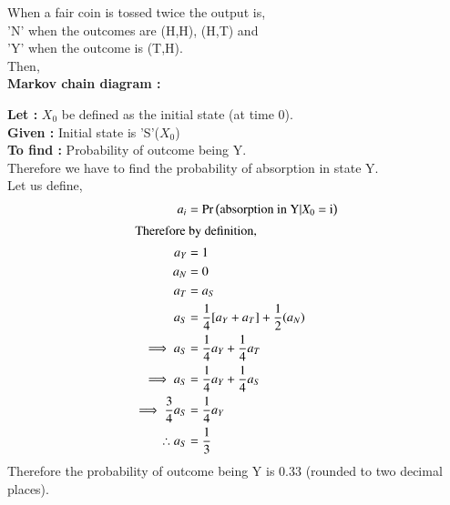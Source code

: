 \documentclass[journal,12pt,twocolumn]{IEEEtran}
\begin{document}
When a fair coin is tossed twice the output is, \\
'N' when the outcomes are (H,H), (H,T) and\\
'Y' when the outcome is (T,H).\\
Then, \\
\textbf{Markov chain diagram :}\\

\textbf{Let :} $X_0$ be defined as the initial state (at time 0). \\
\textbf{Given :} Initial state is 'S'($X_0$)\\
\textbf{To find :} Probability of outcome being Y.\\
Therefore we have to find the probability of absorption in state Y.\\
Let us define,
\begin{align}
    a_i &= \Pr\left(\text{absorption in Y$|X_0$ = i}\right)\\
\shortintertext{Therefore by definition,}
    a_Y &= 1\\
    a_N &= 0\\
    a_T &= a_S\\
    a_S &=  \frac{1}{4}[a_Y + a_T] + \frac{1}{2}(a_N)\\
    \implies a_S &= \frac{1}{4}a_Y + \frac{1}{4}a_T\\
    \implies a_S &= \frac{1}{4}a_Y + \frac{1}{4}a_S\\
    \implies \frac{3}{4}a_S &= \frac{1}{4}a_Y\\
    \therefore a_S &= \frac{1}{3}    
\end{align}
Therefore the probability of outcome being Y is 0.33 (rounded to two decimal places).
\end{document}
